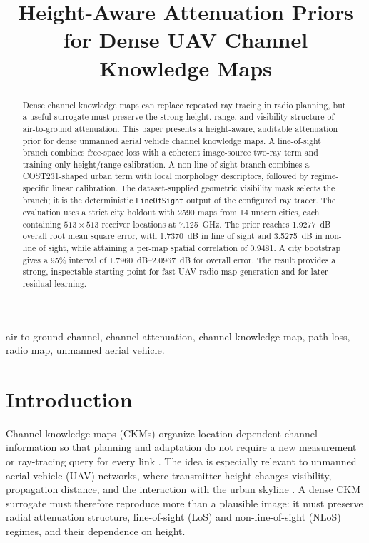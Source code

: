 \documentclass[10pt,conference]{IEEEtran}
\title{Height-Aware Attenuation Priors for Dense UAV Channel Knowledge Maps}
\author{\IEEEauthorblockN{Guillem Moreno Garcia, Sergi Abadal, Evgenii Vinogradov}
\IEEEauthorblockA{Universitat Polit\`ecnica de Catalunya (UPC), Barcelona, Spain\\
guillem.moreno.garcia@estudiantat.upc.edu}}
\begin{document}
\maketitle

\begin{abstract}
Dense channel knowledge maps can replace repeated ray tracing in radio
planning, but a useful surrogate must preserve the strong height, range, and
visibility structure of air-to-ground attenuation. This paper presents a
height-aware, auditable attenuation prior for dense unmanned aerial vehicle
channel knowledge maps. A line-of-sight branch combines free-space loss with a
coherent image-source two-ray term and training-only height/range calibration.
A non-line-of-sight branch combines a COST231-shaped urban term with local
morphology descriptors, followed by regime-specific linear
calibration. The dataset-supplied geometric visibility mask selects the branch;
it is the deterministic \texttt{LineOfSight} output of the configured ray
tracer. The
evaluation uses a strict city holdout with 2590 maps from 14 unseen cities,
each containing $513\times513$ receiver locations at \SI{7.125}{GHz}. The
prior reaches \SI{1.9277}{dB} overall root mean square error, with
\SI{1.7370}{dB} in line of sight and \SI{3.5275}{dB} in non-line of sight,
while attaining a per-map spatial correlation of 0.9481. A city bootstrap
gives a 95\% interval of \SIrange{1.7960}{2.0967}{dB} for overall error. The
result provides a
strong, inspectable starting point for fast UAV radio-map generation and for
later residual learning.
\end{abstract}

\begin{IEEEkeywords}
air-to-ground channel, channel attenuation, channel knowledge map, path loss,
radio map, unmanned aerial vehicle.
\end{IEEEkeywords}

\section{Introduction}

Channel knowledge maps (CKMs) organize location-dependent channel information
so that planning and adaptation do not require a new measurement or ray-tracing
query for every link \cite{zengx2021ckm,ckmtutorial2024}. The idea is especially
relevant to unmanned aerial vehicle (UAV) networks, where transmitter height
changes visibility, propagation distance, and the interaction with the urban
skyline \cite{khawaja_survey,saboor2025height}. A dense CKM surrogate must
therefore reproduce more than a plausible image: it must preserve radial
attenuation structure, line-of-sight (LoS) and non-line-of-sight (NLoS)
regimes, and their dependence on height.
\end{document}
